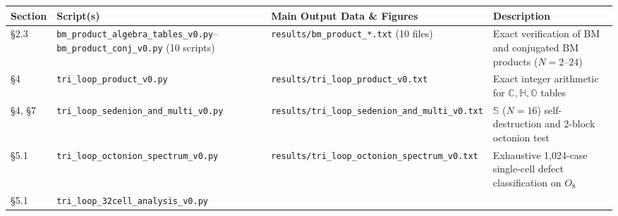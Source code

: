 \documentclass[
  a4paper,
]{article}
\newcounter{none} %
\begin{document}
{\def\LTcaptype{none} %
\begin{longtable}[]{@{}
  >{\raggedright\arraybackslash}p{}
  >{\raggedright\arraybackslash}p{}
  >{\raggedright\arraybackslash}p{}
  >{\raggedright\arraybackslash}p{}@{}}
\toprule\noalign{}
\begin{minipage}[b]{\linewidth}\raggedright
Section
\end{minipage} & \begin{minipage}[b]{\linewidth}\raggedright
Script(s)
\end{minipage} & \begin{minipage}[b]{\linewidth}\raggedright
Main Output Data \& Figures
\end{minipage} & \begin{minipage}[b]{\linewidth}\raggedright
Description
\end{minipage} \\
\midrule\noalign{}
\endhead
\bottomrule\noalign{}
\endlastfoot
§2.3 &
\texttt{bm\_\allowbreak{}product\_\allowbreak{}algebra\_\allowbreak{}tables\_\allowbreak{}v0.py}--\texttt{bm\_\allowbreak{}product\_\allowbreak{}conj\_\allowbreak{}v0.py}
(10 scripts) & \texttt{results/\allowbreak{}bm\_\allowbreak{}product\_\allowbreak{}*.txt} (10 files) & Exact
verification of BM and conjugated BM products (\(N=2\text{–}24\)) \\
§4 & \texttt{tri\_\allowbreak{}loop\_\allowbreak{}product\_\allowbreak{}v0.py} &
\texttt{results/\allowbreak{}tri\_\allowbreak{}loop\_\allowbreak{}product\_\allowbreak{}v0.txt} & Exact integer arithmetic
for \(\mathbb{C}, \mathbb{H}, \mathbb{O}\) tables \\
§4, §7 & \texttt{tri\_\allowbreak{}loop\_\allowbreak{}sedenion\_\allowbreak{}and\_\allowbreak{}multi\_\allowbreak{}v0.py} &
\texttt{results/\allowbreak{}tri\_\allowbreak{}loop\_\allowbreak{}sedenion\_\allowbreak{}and\_\allowbreak{}multi\_\allowbreak{}v0.txt} &
\(\mathbb{S}\) (\(N=16\)) self-destruction and 2-block octonion test \\
§5.1 & \texttt{tri\_\allowbreak{}loop\_\allowbreak{}octonion\_\allowbreak{}spectrum\_\allowbreak{}v0.py} &
\texttt{results/\allowbreak{}tri\_\allowbreak{}loop\_\allowbreak{}octonion\_\allowbreak{}spectrum\_\allowbreak{}v0.txt} & Exhaustive
1,024-case single-cell defect classification on \(O_8\) \\
§5.1 & \texttt{tri\_\allowbreak{}loop\_\allowbreak{}32cell\_\allowbreak{}analysis\_\allowbreak{}v0.py} &

\end{longtable}}
\end{document}
